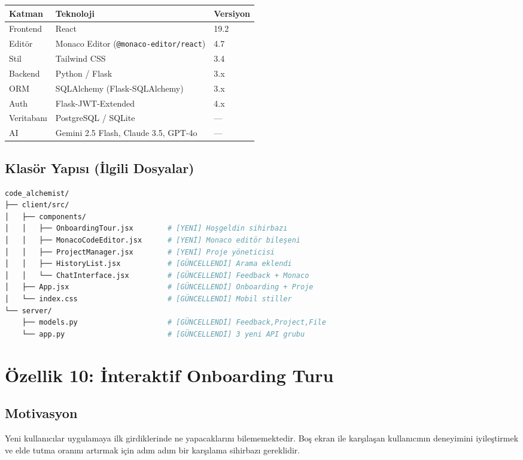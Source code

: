 \documentclass[12pt,a4paper]{article}
\begin{document}
\begin{tabular}{lll}
\toprule
\textbf{Katman} & \textbf{Teknoloji} & \textbf{Versiyon} \\
\midrule
Frontend & React & 19.2 \\
Editör & Monaco Editor (\texttt{@monaco-editor/react}) & 4.7 \\
Stil & Tailwind CSS & 3.4 \\
Backend & Python / Flask & 3.x \\
ORM & SQLAlchemy (Flask-SQLAlchemy) & 3.x \\
Auth & Flask-JWT-Extended & 4.x \\
Veritabanı & PostgreSQL / SQLite & — \\
AI & Gemini 2.5 Flash, Claude 3.5, GPT-4o & — \\
\bottomrule
\end{tabular}

\subsection{Klasör Yapısı (İlgili Dosyalar)}

\begin{lstlisting}[language=bash, caption={Proje yapısı - özellikle değiştirilen dosyalar}]
code_alchemist/
├── client/src/
│   ├── components/
│   │   ├── OnboardingTour.jsx        # [YENİ] Hoşgeldin sihirbazı
│   │   ├── MonacoCodeEditor.jsx      # [YENİ] Monaco editör bileşeni
│   │   ├── ProjectManager.jsx        # [YENİ] Proje yöneticisi
│   │   ├── HistoryList.jsx           # [GÜNCELLENDİ] Arama eklendi
│   │   └── ChatInterface.jsx         # [GÜNCELLENDİ] Feedback + Monaco
│   ├── App.jsx                       # [GÜNCELLENDİ] Onboarding + Proje
│   └── index.css                     # [GÜNCELLENDİ] Mobil stiller
└── server/
    ├── models.py                     # [GÜNCELLENDİ] Feedback,Project,File
    └── app.py                        # [GÜNCELLENDİ] 3 yeni API grubu
\end{lstlisting}

\newpage

\section{Özellik 10: İnteraktif Onboarding Turu}

\subsection{Motivasyon}
Yeni kullanıcılar uygulamaya ilk girdiklerinde ne yapacaklarını bilememektedir. Boş ekran ile karşılaşan kullanıcının deneyimini iyileştirmek ve elde tutma oranını artırmak için adım adım bir karşılama sihirbazı gereklidir.
\end{document}
